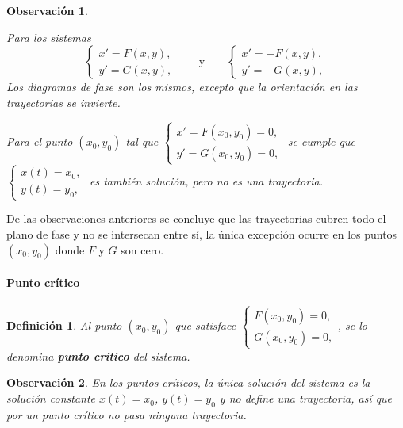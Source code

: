 \documentclass[a5paper,doc,10pt,noapacite]{apa6}
\newcommand{\yds}{\qquad\text{y}\qquad}
\newtheorem{definicion}{Definición}
\newtheorem{observ}{Observación}
\begin{document}
{{\begin{observ}
\begin{APAenumerate}
		\item Para los sistemas
		\[
			\begin{cases}
			x' = F(x,y),
			 \\
			y' = G(x,y),
			\end{cases}
			\yds
			\begin{cases}
			x' = -F(x,y),
			 \\
			y' = -G(x,y),
			\end{cases}
		\]
		Los diagramas de fase son los mismos, excepto que la orientación en las trayectorias se invierte.


		\item Para el punto \((x_0,y_0)\) tal que
		\(
			\begin{cases}
			x' = F(x_0,y_0)=0,
			 \\
			y' = G(x_0,y_0)=0,
			\end{cases}
		\)\hspace{-1em}
		se cumple que 
		\(
			\begin{cases}
			x(t) = x_0,
			 \\
			y(t) = y_0,
			\end{cases}
		\)\hspace{-1em}
		es también solución, pero no es una  trayectoria.
		
		
	\end{APAenumerate}
\end{observ}

De las observaciones anteriores se concluye que las trayectorias cubren todo el plano de fase y no se intersecan entre sí, la única excepción ocurre en los puntos \((x_0,y_0)\) donde \(F\) y \(G\) son cero.



\paragraph{Punto crítico}

\begin{definicion}
	Al punto \((x_0,y_0)\) que satisface \(\begin{cases}
			F(x_0,y_0)=0,
			 \\
			G(x_0,y_0)=0,
			\end{cases}
		\)\hspace{-1em}, se lo denomina \textbf{\emph{punto crítico}} del sistema.
\end{definicion}

\begin{observ}
	En los puntos críticos, la única solución del sistema es la solución constante \(x(t)=x_0\), \(y(t)=y_0\) y no define una trayectoria, así que por un punto crítico no pasa ninguna trayectoria.
	

\end{observ}}}
\end{document}
